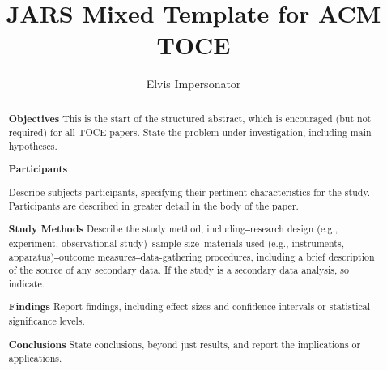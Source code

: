 \documentclass[acmsmall]{acmart}
\begin{document}
\title[JARS Mixed Template for ACM TOCE]{JARS Mixed Template for ACM TOCE}

\author{Elvis Impersonator}

\renewcommand{\shortauthors}{You et al.}

\newcommand{\AbstractCategory}[1]{%
  \par\addvspace{.5\baselineskip}%
  \noindent\textbf{#1}\quad\ignorespaces
}

%
\begin{abstract}
\AbstractCategory{Objectives}This is the start of the structured abstract, which is encouraged (but not required) for all TOCE papers. State the problem under investigation, including main hypotheses.


\AbstractCategory{Participants}
Describe subjects participants, specifying their pertinent characteristics for the study. Participants are described in greater detail in the body of the paper.

\AbstractCategory{Study Methods} Describe the study method, including‒research design (e.g., experiment, observational study)‒sample size‒materials used (e.g., instruments, apparatus)‒outcome measures‒data-gathering procedures, including a brief description of the source of any secondary data. If the study is a secondary data analysis, so indicate.

\AbstractCategory{Findings} Report findings, including effect sizes and confidence intervals or statistical significance levels.

\AbstractCategory{Conclusions} State conclusions, beyond just results, and report the implications or applications.

\end{abstract}
\end{document}
